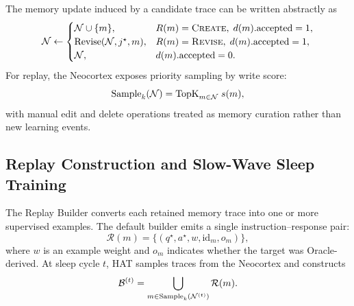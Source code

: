 The memory update induced by a candidate trace can be written abstractly as
\begin{equation}
  \mathcal{N} \leftarrow
  \begin{cases}
    \mathcal{N} \cup \{m\}, & R(m)=\textsc{Create},\; d(m).\mathrm{accepted}=1, \\
    \mathrm{Revise}(\mathcal{N}, j^{\star}, m), & R(m)=\textsc{Revise},\; d(m).\mathrm{accepted}=1, \\
    \mathcal{N}, & d(m).\mathrm{accepted}=0.
  \end{cases}
  \label{eq:neocortex_transition}
\end{equation}
For replay, the Neocortex exposes priority sampling by write score:
\begin{equation}
  \mathrm{Sample}_k(\mathcal{N})
  =
  \mathrm{TopK}_{m\in\mathcal{N}}\; s(m),
  \label{eq:priority_sample}
\end{equation}
with manual edit and delete operations treated as memory curation rather than new learning events.

\subsection{Replay Construction and Slow-Wave Sleep Training}
\label{sec:method:sws}

The Replay Builder converts each retained memory trace into one or more supervised examples.
The default builder emits a single instruction--response pair:
\begin{equation}
  \mathcal{R}(m)
  =
  \{(q^{\star}, a^{\star}, w, \mathrm{id}_m, o_m)\},
  \label{eq:replay_builder}
\end{equation}
where $w$ is an example weight and $o_m$ indicates whether the target was Oracle-derived.
At sleep cycle $t$, HAT samples traces from the Neocortex and constructs
\begin{equation}
  \mathcal{B}^{(t)}
  =
  \bigcup_{m\in \mathrm{Sample}_k(\mathcal{N}^{(t)})}
  \mathcal{R}(m).
  \label{eq:replay_batch}
\end{equation}

